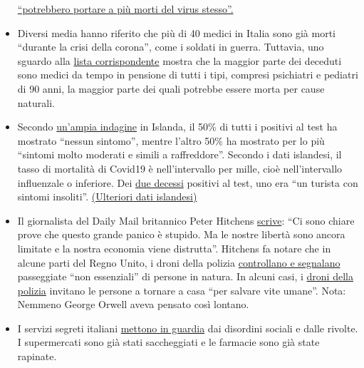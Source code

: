 \begin{itemize}
  \href{https://www.zdf.de/nachrichten/politik/coronavirus-epidemiologe-folgen-helmholtz-100.html}{``potrebbero
  portare a più morti del virus stesso''.}
\item
  Diversi media hanno riferito che più di 40 medici in Italia sono già
  morti ``durante la crisi della corona'', come i soldati in guerra.
  Tuttavia, uno sguardo alla
  \href{https://web.archive.org/web/20200328152430/https://portale.fnomceo.it/elenco-dei-medici-caduti-nel-corso-dellepidemia-di-covid-19/}{lista
  corrispondente} mostra che la maggior parte dei deceduti sono medici
  da tempo in pensione di tutti i tipi, compresi psichiatri e pediatri
  di 90 anni, la maggior parte dei quali potrebbe essere morta per cause
  naturali.
\item
  Secondo
  \href{https://www.buzzfeed.com/albertonardelli/coronavirus-testing-iceland}{un'ampia
  indagine} in Islanda, il 50\% di tutti i positivi al test ha mostrato
  ``nessun sintomo'', mentre l'altro 50\% ha mostrato per lo più
  ``sintomi molto moderati e simili a raffreddore''. Secondo i dati
  islandesi, il tasso di mortalità di Covid19 è nell'intervallo per
  mille, cioè nell'intervallo influenzale o inferiore. Dei
  \href{https://www.government.is/news/article/?newsid=c65cf658-6eb6-11ea-9462-005056bc4d74}{due
  decessi} positivi al test, uno era ``un turista con sintomi
  insoliti''. \href{https://www.covid.is/data}{(Ulteriori dati
  islandesi)}
\item
  Il giornalista del Daily Mail britannico Peter Hitchens
  \href{https://hitchensblog.mailonsunday.co.uk/2020/03/theres-powerful-evidence-this-great-panic-is-foolish-yet-our-freedom-is-still-broken-and-our-economy.html}{scrive}:
  ``Ci sono chiare prove che questo grande panico è stupido. Ma le
  nostre libertà sono ancora limitate e la nostra economia viene
  distrutta''. Hitchens fa notare che in alcune parti del Regno Unito, i
  droni della polizia
  \href{https://www.youtube.com/watch?v=fHNxDzLsPeg}{controllano e
  segnalano} passeggiate ``non essenziali'' di persone in natura. In
  alcuni casi, i
  \href{https://www.youtube.com/watch?v=D4GEZjUTkqc}{droni della
  polizia} invitano le persone a tornare a casa ``per salvare vite
  umane''. Nota: Nemmeno George Orwell aveva pensato così lontano.
\item
  I servizi segreti italiani
  \href{https://www.focus.de/panorama/welt/sorge-vor-sozialen-unruhen-supermaerkte-gepluendert-apotheken-ueberfallen-italiens-geheimdienst-warnt-vor-aufstaenden_id_11826664.html}{mettono
  in guardia} dai disordini sociali e dalle rivolte. I supermercati sono
  già stati saccheggiati e le farmacie sono già state rapinate.
\end{itemize}


